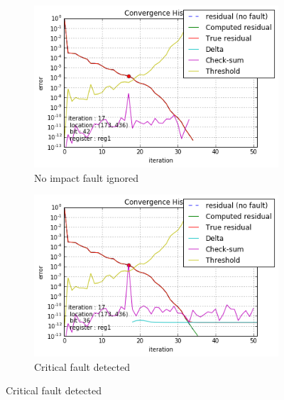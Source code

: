 \begin{figure}[h]
\begin{minipage}[b]{0.48\linewidth}
	\begin{subfigure}[t]{\linewidth}
		\centering
		\includegraphics[width=\linewidth]{figures/pores_2/convergence_history_threshold_0.png}
		\caption{No impact fault ignored}\label{fig:pores_2_conv_hist_threshold_0}
	\end{subfigure}
    \quad
    \begin{subfigure}[t]{\linewidth}
		\centering
		\includegraphics[width=\linewidth]{figures/pores_2/convergence_history_threshold_2.png}
		\caption{Critical fault detected}\label{fig:pores_2_conv_hist_threshold_2}
	\end{subfigure}


\end{minipage}
\end{figure}
